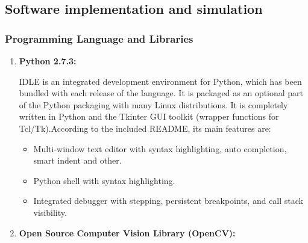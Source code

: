 \documentclass[12pt, a4paper]{article}
\begin{document}
\subsection{Software implementation and simulation}
\subsubsection{Programming Language and Libraries}
\begin{enumerate}

\item \textbf{Python 2.7.3:}

IDLE is an integrated development environment for Python, which has been bundled with each release of the language. It is packaged as an optional part of the Python packaging
with many Linux distributions. It is completely written in Python and the Tkinter GUI
toolkit (wrapper functions for Tcl/Tk).According to the included README, its main
features are:
\begin{itemize}
\item Multi-window text editor with syntax highlighting, auto completion, smart indent
and other.
\item Python shell with syntax highlighting.
\item Integrated debugger with stepping, persistent breakpoints, and call stack visibility.
\end{itemize}
\item \textbf{Open Source Computer Vision Library (OpenCV):}


\end{enumerate}
\end{document}
